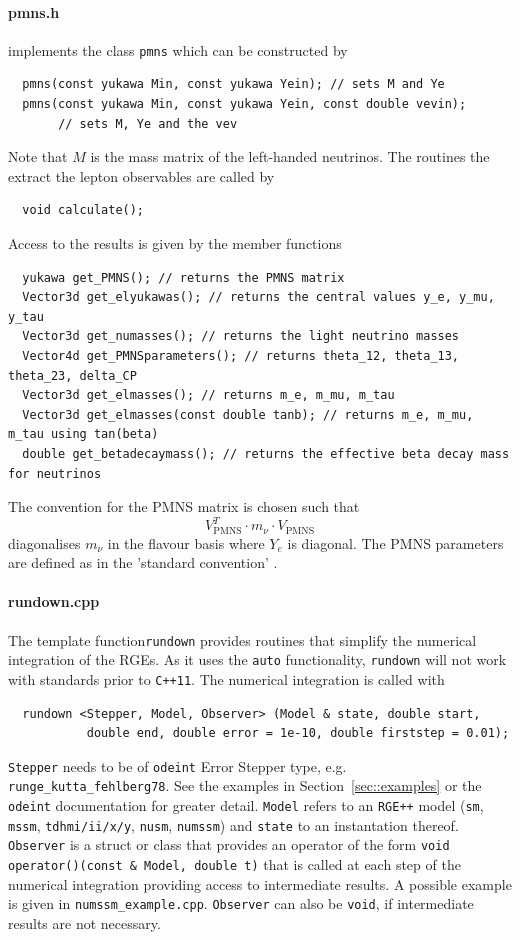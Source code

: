 \documentclass[preprint,12pt]{elsarticle}
\begin{document}
\paragraph{pmns.h}
implements the class \texttt{pmns} which can be constructed by
\begin{lstlisting}
  pmns(const yukawa Min, const yukawa Yein); // sets M and Ye
  pmns(const yukawa Min, const yukawa Yein, const double vevin);
       // sets M, Ye and the vev
\end{lstlisting}
Note that $M$ is the mass matrix of the left-handed neutrinos.
The routines the extract the lepton observables are called by
\begin{lstlisting}
  void calculate();
\end{lstlisting}
Access to the results is given by the member functions
\begin{lstlisting}
  yukawa get_PMNS(); // returns the PMNS matrix
  Vector3d get_elyukawas(); // returns the central values y_e, y_mu, y_tau
  Vector3d get_numasses(); // returns the light neutrino masses
  Vector4d get_PMNSparameters(); // returns theta_12, theta_13, theta_23, delta_CP
  Vector3d get_elmasses(); // returns m_e, m_mu, m_tau
  Vector3d get_elmasses(const double tanb); // returns m_e, m_mu, m_tau using tan(beta)
  double get_betadecaymass(); // returns the effective beta decay mass for neutrinos
\end{lstlisting}
The convention for the PMNS matrix is chosen such that
\begin{equation}
  V_{\mathrm{PMNS}}^T \cdot m_\nu \cdot V_{\mathrm{PMNS}}
\end{equation}
diagonalises $m_\nu$ in the flavour basis where $Y_e$ is diagonal. The PMNS parameters are defined as in the 'standard convention' \cite{Patrignani:2016xqp}.

\paragraph{rundown.cpp}
The template function\texttt{rundown} provides routines that simplify the numerical integration of the RGEs. As it uses the \texttt{auto} functionality, \texttt{rundown} will not work with standards prior to \texttt{C++11}. The numerical integration is called with
\begin{lstlisting}
  rundown <Stepper, Model, Observer> (Model & state, double start,
           double end, double error = 1e-10, double firststep = 0.01);
\end{lstlisting}
\texttt{Stepper} needs to be of \texttt{odeint} Error Stepper type, e.g. \texttt{runge\_kutta\_fehlberg78}. See the examples in Section~\ref{sec::examples} or the \texttt{odeint} documentation for greater detail. \texttt{Model} refers to an \texttt{RGE++} model (\texttt{sm}, \texttt{mssm}, \texttt{tdhmi/ii/x/y}, \texttt{nusm}, \texttt{numssm}) and \texttt{state} to an instantation thereof. \texttt{Observer} is a struct or class that provides an operator of the form \texttt{void operator()(const \& Model, double t)} that is called at each step of the numerical integration providing access to intermediate results. A possible example is given in \texttt{numssm\_example.cpp}. \texttt{Observer} can also be \texttt{void}, if intermediate results are not necessary.
\end{document}
